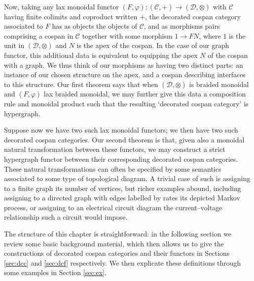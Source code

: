 Now, taking any lax monoidal functor $(F,\varphi)\colon  (\mathcal C,+) \to (\mathcal
D,\otimes)$ with $\mathcal C$ having finite colimits and coproduct written $+$,
the decorated cospan category associated to $F$ has as objects the objects of
$\mathcal C$, and as morphisms pairs comprising a cospan in $\mathcal C$
together with some morphism $1 \to FN$, where $1$ is the unit in $(\mathcal
D,\otimes)$ and $N$ is the apex of the cospan. In the case of our graph
functor, this additional data is equivalent to equipping the apex $N$ of the
cospan with a graph. We thus think of our morphisms as having two distinct
parts: an instance of our chosen structure on the apex, and a cospan describing
interfaces to this structure. Our first theorem says that when $(\mathcal
D,\otimes)$ is braided monoidal and $(F,\varphi)$ lax braided monoidal, we may
further give this data a composition rule and monoidal product such that the
resulting `decorated cospan category' is hypergraph.  

Suppose now we have two such lax monoidal functors; we then have two such
decorated cospan categories. Our second theorem is that, given also a monoidal
natural transformation between these functors, we may construct a strict
hypergraph functor between their corresponding decorated cospan categories.  These
natural transformations can often be specified by some semantics associated to
some type of topological diagram. A trivial case of such is assigning to a
finite graph its number of vertices, but richer examples abound, including
assigning to a directed graph with edges labelled by rates its depicted Markov
process, or assigning to an electrical circuit diagram the current--voltage
relationship such a circuit would impose.

The structure of this chapter is straightforward: in the following section we
review some basic background material, which then allows us to give the
constructions of decorated cospan categories and their functors in Sections
\ref{sec:dcc} and \ref{sec:dcf} respectively. We then explicate these
definitions through some examples in Section \ref{sec:ex}. 


